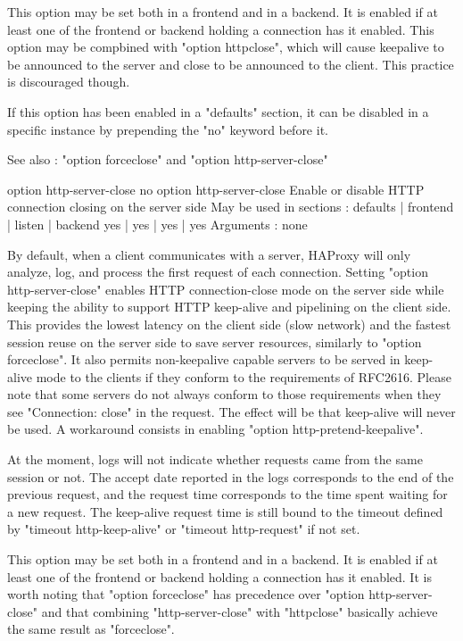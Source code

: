   This option may be set both in a frontend and in a backend. It is enabled if
  at least one of the frontend or backend holding a connection has it enabled.
  This option may be compbined with "option httpclose", which will cause
  keepalive to be announced to the server and close to be announced to the
  client. This practice is discouraged though.

  If this option has been enabled in a "defaults" section, it can be disabled
  in a specific instance by prepending the "no" keyword before it.

  See also : "option forceclose" and "option http-server-close"


option http-server-close
no option http-server-close
  Enable or disable HTTP connection closing on the server side
  May be used in sections :   defaults | frontend | listen | backend
                                 yes   |    yes   |   yes  |   yes
  Arguments : none

  By default, when a client communicates with a server, HAProxy will only
  analyze, log, and process the first request of each connection. Setting
  "option http-server-close" enables HTTP connection-close mode on the server
  side while keeping the ability to support HTTP keep-alive and pipelining on
  the client side.  This provides the lowest latency on the client side (slow
  network) and the fastest session reuse on the server side to save server
  resources, similarly to "option forceclose". It also permits non-keepalive
  capable servers to be served in keep-alive mode to the clients if they
  conform to the requirements of RFC2616. Please note that some servers do not
  always conform to those requirements when they see "Connection: close" in the
  request. The effect will be that keep-alive will never be used. A workaround
  consists in enabling "option http-pretend-keepalive".

  At the moment, logs will not indicate whether requests came from the same
  session or not. The accept date reported in the logs corresponds to the end
  of the previous request, and the request time corresponds to the time spent
  waiting for a new request. The keep-alive request time is still bound to the
  timeout defined by "timeout http-keep-alive" or "timeout http-request" if
  not set.

  This option may be set both in a frontend and in a backend. It is enabled if
  at least one of the frontend or backend holding a connection has it enabled.
  It is worth noting that "option forceclose" has precedence over "option
  http-server-close" and that combining "http-server-close" with "httpclose"
  basically achieve the same result as "forceclose".

